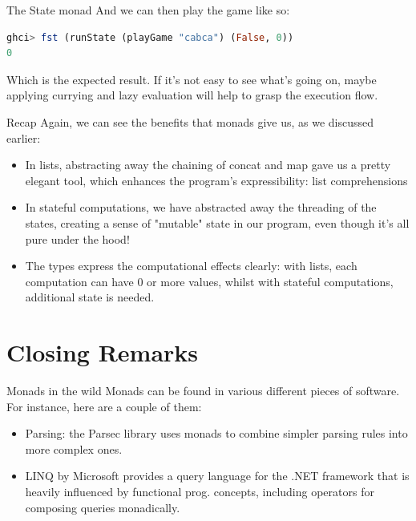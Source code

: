 \documentclass{beamer}
\begin{document}
\begin{frame}[fragile]{The State monad}
    And we can then play the game like so:

    \bigbreak
    \begin{minipage}{\linewidth} \hspace{1cm}
    \begin{lstlisting}[language=haskell, numbers=none, frame=none]
ghci> fst (runState (playGame "cabca") (False, 0))
0
    \end{lstlisting}
    \end{minipage} \hspace{1cm}

    \bigbreak
    Which is the expected result. If it's not easy to see what's going
    on, maybe applying currying and lazy evaluation will help to grasp
    the execution flow.
\end{frame}

\begin{frame}[fragile]{Recap}
    Again, we can see the benefits that monads give us, as we discussed
    earlier:

    \bigbreak
    \begin{itemize}
        \setlength \itemsep{1em}
        \item In lists, abstracting away the chaining of concat and map
              gave us a pretty elegant tool, which enhances the program's
              expressibility: list comprehensions
        \item In stateful computations, we have abstracted away the
              threading of the states, creating a sense of "mutable"
              state in our program, even though it's all pure under
              the hood!
        \item The types express the computational effects clearly: with
              lists, each computation can have 0 or more values, whilst
              with stateful computations, additional state is needed.
    \end{itemize}
\end{frame}

\section{Closing Remarks}

\begin{frame}[fragile]{Monads in the wild}
    Monads can be found in various different pieces of software. For
    instance, here are a couple of them:

    \bigbreak
    \begin{itemize}
        \setlength \itemsep{1em}
        \item Parsing: the Parsec library uses monads to combine simpler
              parsing rules into more complex ones.
        \item LINQ by Microsoft provides a query language for the .NET
              framework that is heavily influenced by functional prog.
              concepts, including operators for composing queries
              monadically.
    \end{itemize}
\end{frame}
\end{document}
